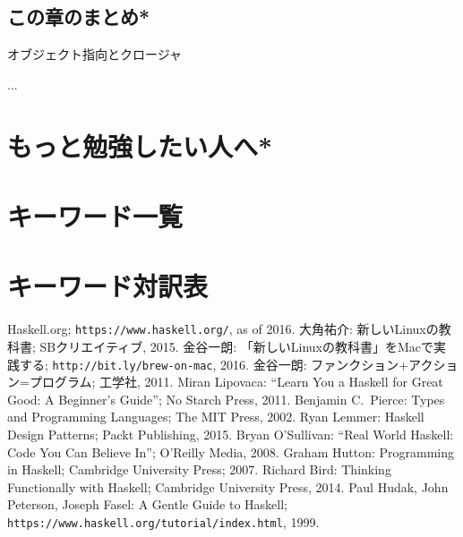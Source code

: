 \documentclass[a4paper,twocolumn]{jsbook}
\newcommand{\programminglanguage}[1]{\textsf{#1}}
\newcommand{\cxx}{\programminglanguage{C}\texttt{++}}
\newenvironment{note}[1]{\begin{boxnote}\begin{center}#1\end{center}}{\end{boxnote}}
\begin{document}
\section{この章のまとめ*}

\begin{note}{オブジェクト指向とクロージャ}
...
\end{note}



\chapter{もっと勉強したい人へ*}

\chapter*{キーワード一覧}

\chapter*{キーワード対訳表}


\begin{thebibliography}{99}
 Haskell.org; \texttt{https://www.haskell.org/}, as of 2016.
 大角祐介: 新しいLinuxの教科書; SBクリエイティブ, 2015.
 金谷一朗: 「新しいLinuxの教科書」をMacで実践する; \texttt{http://bit.ly/brew-on-mac}, 2016.
 金谷一朗: ファンクション+アクション=プログラム; 工学社, 2011.
Miran Lipovaca: ``Learn You a Haskell for Great Good: A Beginner's Guide''; No Starch Press, 2011.
 Benjamin C.~Pierce: Types and Programming Languages; The MIT Press, 2002.
 Ryan Lemmer: Haskell Design Patterns; Packt Publishing, 2015.
 Bryan O'Sullivan: ``Real World Haskell: Code You Can Believe In''; O'Reilly Media, 2008.
 Graham Hutton: Programming in Haskell; Cambridge University Press; 2007.
 Richard Bird: Thinking Functionally with Haskell; Cambridge University Press, 2014.
 Paul Hudak, John Peterson, Joseph Fasel: A Gentle Guide to Haskell; \texttt{https://www.haskell.org/tutorial/index.html}, 1999.
\end{thebibliography}
\end{document}

